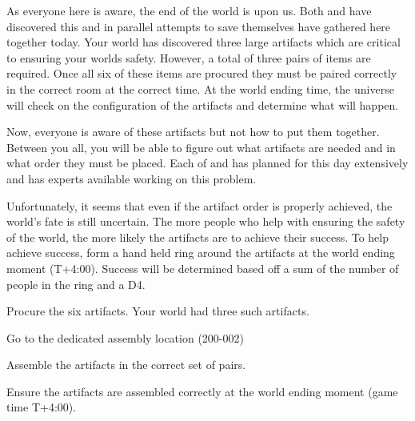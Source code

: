\documentclass[green]{guildcamp3}
\begin{document}
\name{\gSaveWorld{}}



As everyone here is aware, the end of the world is upon us. Both \bMagicWorld{} and \bTechWorld{} have discovered this and in parallel attempts to save themselves have gathered here together today. Your world has discovered three large artifacts which are critical to ensuring your worlds safety. However, a total of three pairs of items are required. Once all six of these items are procured they must be paired correctly in the correct room at the correct time. At the world ending time, the universe will check on the configuration of the artifacts and determine what will happen. 

Now, everyone is aware of these artifacts but not how to put them together. Between you all, you will be able to figure out what artifacts are needed and in what order they must be placed. Each of \bTechWorld{} and \bMagicWorld{} has planned for this day extensively and has experts available working on this problem. 

Unfortunately, it seems that even if the artifact order is properly achieved, the world's fate is still uncertain. The more people who help with ensuring the safety of the world, the more likely the artifacts are to achieve their success. To help achieve success, form a hand held ring around the artifacts at the world ending moment (T+4:00). Success will be determined based off a sum of the number of people in the ring and a D4. 


\begin{enum}[Directions]
  \item Procure the six artifacts. Your world had three such artifacts.  
  \item Go to the dedicated assembly location (200-002)
  \item Assemble the artifacts in the correct set of pairs.
  \item Ensure the artifacts are assembled correctly at the world ending moment (game time T+4:00). 
\end{enum}
\end{document}
